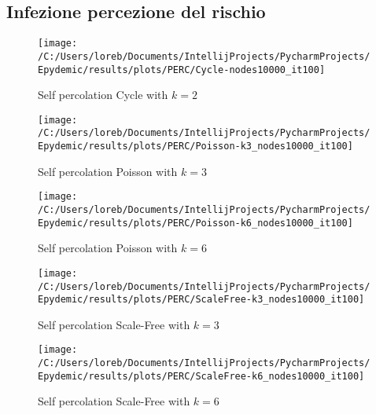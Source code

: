 \subsection{Infezione percezione del rischio}\label{subsec:app-infezione-con-la-percezione-del-rischio}
    \begin{figure}[H]
        \texttt{[image: /C:/Users/loreb/Documents/IntellijProjects/PycharmProjects/Epydemic/results/plots/PERC/Cycle-nodes10000\_it100]}\caption{Self percolation Cycle with $k=2$}
        \label{fig:perc_cycle}
    \end{figure}
    \begin{figure}[H]
        \texttt{[image: /C:/Users/loreb/Documents/IntellijProjects/PycharmProjects/Epydemic/results/plots/PERC/Poisson-k3\_nodes10000\_it100]}\caption{Self percolation Poisson with $k=3$}
        \label{fig:perc_poisson_k_3}
    \end{figure}
    \begin{figure}[H]
        \texttt{[image: /C:/Users/loreb/Documents/IntellijProjects/PycharmProjects/Epydemic/results/plots/PERC/Poisson-k6\_nodes10000\_it100]}\caption{Self percolation Poisson with $k=6$}
        \label{fig:perc_poisson_k_6}
    \end{figure}
    \begin{figure}[H]
        \texttt{[image: /C:/Users/loreb/Documents/IntellijProjects/PycharmProjects/Epydemic/results/plots/PERC/ScaleFree-k3\_nodes10000\_it100]}\caption{Self percolation Scale-Free with $k=3$}
        \label{fig:perc_scale_free_k_3}
    \end{figure}
    \begin{figure}[H]
        \texttt{[image: /C:/Users/loreb/Documents/IntellijProjects/PycharmProjects/Epydemic/results/plots/PERC/ScaleFree-k6\_nodes10000\_it100]}\caption{Self percolation Scale-Free with $k=6$}
        \label{fig:perc_scale_free_k_6}
    \end{figure}

